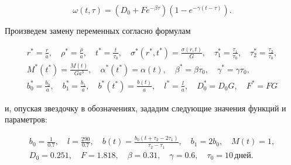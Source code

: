 \begin{equation*}

  \omega(t,\tau)=(D_0+Fe^{-\beta\tau})(1-e^{-\gamma(t-\tau)}).

\end{equation*}



Произведем замену переменных согласно формулам

\begin{gather}

  r^*=\frac ra,\quad

  \rho^*=\frac\rho a,\quad

  t^*=\frac t{\tau_0},\quad

  \sigma^*(r^*,t^*)=\frac{\sigma(r,t)}G,

\quad 

  \tau_1^*=\frac{\tau_1}{\tau_0},\quad

  \tau_2^*=\frac{\tau_2}{\tau_0},

  \\  

  M^*(t^*)=\frac{M(t)}{Ga^3},\quad

  \alpha^*(t^*)=\alpha(t), \quad 

  \beta^*=\beta\tau_0,\quad

  \gamma^*=\gamma\tau_0,\\

  b_0^*=\frac{b_0}a,\quad

  b_1^*=\frac{b_1}a,

\quad 

  b^*(t^*)=\frac{b(t)}a,\quad

  l^*=\frac la,\quad

  D_0^*=D_0G,\quad

  F^*=FG

\end{gather}

и, опуская звездочку в обозначениях, зададим следующие значения функций и параметров:

\begin{gather*}

  b_0=\frac1{0.7},\quad

  l=\frac{290}{0.7},\quad

  b(t)=\frac{b_0(t+\tau_2-2\tau_1)}{\tau_2-\tau_1},

\quad 

  b_1=2b_0,\quad

  M(t)=1,\\

  D_0=0.251,\quad

  F=1.818,

\quad 

  \beta=0.31,\quad

  \gamma=0.6,\quad

  \tau_0=10\,\text{дней}.

\end{gather*}



